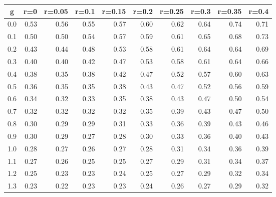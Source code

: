 %
\begin{table}[!tbp]
 \begin{center}
 \begin{tabular}{rrrrrrrrrr}\hline\hline
\multicolumn{1}{c}{g}&\multicolumn{1}{c}{r=0}&\multicolumn{1}{c}{r=0.05}&\multicolumn{1}{c}{r=0.1}&\multicolumn{1}{c}{r=0.15}&\multicolumn{1}{c}{r=0.2}&\multicolumn{1}{c}{r=0.25}&\multicolumn{1}{c}{r=0.3}&\multicolumn{1}{c}{r=0.35}&\multicolumn{1}{c}{r=0.4}\tabularnewline
\hline
0.0&0.53&0.56&0.55&0.57&0.60&0.62&0.64&0.74&0.71\tabularnewline
0.1&0.50&0.50&0.54&0.57&0.59&0.61&0.65&0.68&0.73\tabularnewline
0.2&0.43&0.44&0.48&0.53&0.58&0.61&0.64&0.64&0.69\tabularnewline
0.3&0.40&0.40&0.42&0.47&0.53&0.58&0.61&0.64&0.66\tabularnewline
0.4&0.38&0.35&0.38&0.42&0.47&0.52&0.57&0.60&0.63\tabularnewline
0.5&0.36&0.35&0.35&0.38&0.43&0.47&0.52&0.56&0.59\tabularnewline
0.6&0.34&0.32&0.33&0.35&0.38&0.43&0.47&0.50&0.54\tabularnewline
0.7&0.32&0.32&0.32&0.32&0.35&0.39&0.43&0.47&0.50\tabularnewline
0.8&0.30&0.29&0.29&0.31&0.33&0.36&0.39&0.43&0.46\tabularnewline
0.9&0.30&0.29&0.27&0.28&0.30&0.33&0.36&0.40&0.43\tabularnewline
1.0&0.28&0.27&0.26&0.27&0.28&0.31&0.34&0.36&0.39\tabularnewline
1.1&0.27&0.26&0.25&0.25&0.27&0.29&0.31&0.34&0.37\tabularnewline
1.2&0.25&0.23&0.23&0.24&0.25&0.27&0.29&0.32&0.34\tabularnewline
1.3&0.23&0.22&0.23&0.23&0.24&0.26&0.27&0.29&0.32\tabularnewline
\hline
\end{tabular}

\end{center}

\end{table}

